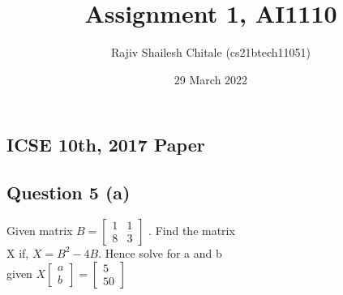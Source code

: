 \documentclass[journal,12pt,twocolumn]{article}
\title{Assignment 1, AI1110}
\author{Rajiv Shailesh Chitale (cs21btech11051)}
\date{29 March 2022}
\begin{document}
\maketitle

\subsection*{ICSE 10th, 2017 Paper}
\subsection*{Question 5 (a)}
    Given matrix $B = \begin{bmatrix} 1 & 1 \\8 & 3 \end{bmatrix}$
    . Find the matrix 
    \\
    X if,  $X = B^2-4B$. Hence solve for a and b 
    \\
    given $X \begin{bmatrix}a\\b\end{bmatrix}
    = \begin{bmatrix} 5\\50 \end{bmatrix} $
\end{document}
